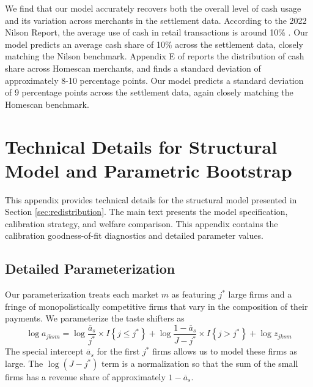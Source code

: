 \documentclass[11pt,english]{article}
\theoremstyle{remark}
\begin{document}
We find that our model accurately recovers both the overall level of cash usage and its variation across merchants in the settlement data.
According to the 2022 Nilson Report, the average use of cash in retail transactions is around 10\% \citep{Nilson2023a}.
Our model predicts an average cash share of 10\% across the settlement data, closely matching the Nilson benchmark.
Appendix E of \citet{Wang2025} reports the distribution of cash share across Homescan merchants, and finds a standard deviation of approximately 8-10 percentage points.
Our model predicts a standard deviation of 9 percentage points across the settlement data, again closely matching the Homescan benchmark.





































\clearpage{}


\section{Technical Details for Structural Model and Parametric Bootstrap}\label{sec:appendix-calibrated}

This appendix provides technical details for the structural model presented in Section \ref{sec:redistribution}.
The main text presents the model specification, calibration strategy, and welfare comparison.
This appendix contains the calibration goodness-of-fit diagnostics and detailed parameter values.

\subsection{Detailed Parameterization}

Our parameterization treats each market $m$ as featuring $j^{*}$ large firms and a fringe of monopolistically competitive firms that vary in the composition of their payments.
We parameterize the taste shifters as
\[
\log a_{jksm}=\log\frac{\overline{a}_{s}}{j^{*}}\times I\left\{ j\leq j^{*}\right\} +\log\frac{1-\overline{a}_{s}}{J-j^{*}}\times I\left\{ j>j^{*}\right\} +\log z_{jksm}
\]
The special intercept $\overline{a}_{s}$ for the first $j^{*}$ firms allows us to model these firms as large.
The $\log(J-j^{*})$ term is a normalization so that the sum of the small firms has a revenue share of approximately $1-\overline{a}_{s}$.
\end{document}
